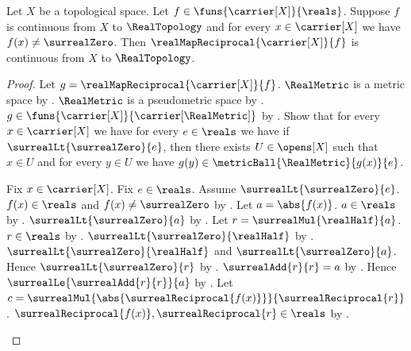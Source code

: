 \begin{theorem}\label{real_map_reciprocal_continuous}
    Let $X$ be a topological space.
    Let $f\in\funs{\carrier[X]}{\reals}$.
    Suppose $f$ is continuous from $X$ to $\RealTopology$ and
        for every $x\in\carrier[X]$ we have $f(x)\neq\surrealZero$.
    Then $\realMapReciprocal{\carrier[X]}{f}$ is continuous from
        $X$ to $\RealTopology$.
\end{theorem}
\begin{proof}
    Let $g=\realMapReciprocal{\carrier[X]}{f}$.
    $\RealMetric$ is a metric space by .
    $\RealMetric$ is a pseudometric space by
        .
    $g\in\funs{\carrier[X]}{\carrier[\RealMetric]}$
        by
        .
    Show that for every $x\in\carrier[X]$ we have
        for every $e\in\reals$ we have if
            $\surrealLt{\surrealZero}{e}$, then there exists
            $U\in\opens[X]$ such that $x\in U$ and
            for every $y\in U$ we have
                $g(y)\in\metricBall{\RealMetric}{g(x)}{e}$.
    \begin{subproof}
        Fix $x\in\carrier[X]$.
        Fix $e\in\reals$.
        Assume $\surrealLt{\surrealZero}{e}$.
        $f(x)\in\reals$ and $f(x)\neq\surrealZero$
            by .
        Let $a=\abs{f(x)}$.
        $a\in\reals$ by .
        $\surrealLt{\surrealZero}{a}$
            by
            .
        Let $r=\surrealMul{\realHalf}{a}$.
        $r\in\reals$
            by
            .
        $\surrealLt{\surrealZero}{\realHalf}$
            by .
        $\surrealLt{\surrealZero}{\realHalf}$ and
            $\surrealLt{\surrealZero}{a}$.
        Hence $\surrealLt{\surrealZero}{r}$
            by
            .
        $\surrealAdd{r}{r}=a$
            by
            .
        Hence $\surrealLe{\surrealAdd{r}{r}}{a}$
            by .
        Let $c=\surrealMul{\abs{\surrealReciprocal{f(x)}}}
            {\surrealReciprocal{r}}$.
        $\surrealReciprocal{f(x)},\surrealReciprocal{r}\in\reals$
            by .

\end{subproof}
\end{proof}
